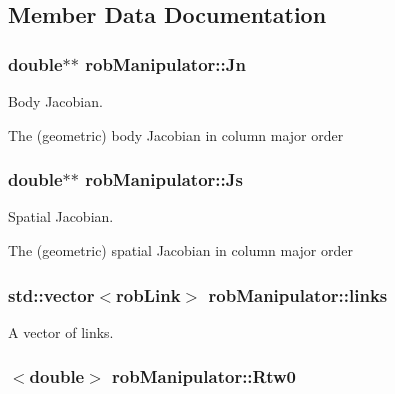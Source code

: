 \subsection{Member Data Documentation}
\hypertarget{classrob_manipulator_a997ff4a6cabe644ff4dd4877d51e2fb4}{}
\subsubsection[{Jn}]{\setlength{\rightskip}{0pt plus 5cm}double$\ast$$\ast$ rob\+Manipulator\+::\+Jn}\label{classrob_manipulator_a997ff4a6cabe644ff4dd4877d51e2fb4}


Body Jacobian. 

The (geometric) body Jacobian in column major order \hypertarget{classrob_manipulator_a5c8636fedd8f1a77ea297f87527cb85e}{}
\subsubsection[{Js}]{\setlength{\rightskip}{0pt plus 5cm}double$\ast$$\ast$ rob\+Manipulator\+::\+Js}\label{classrob_manipulator_a5c8636fedd8f1a77ea297f87527cb85e}


Spatial Jacobian. 

The (geometric) spatial Jacobian in column major order \hypertarget{classrob_manipulator_a255e6fb341202762ad75a54c1d040eda}{}
\subsubsection[{links}]{\setlength{\rightskip}{0pt plus 5cm}std\+::vector$<${\bf rob\+Link}$>$ rob\+Manipulator\+::links}\label{classrob_manipulator_a255e6fb341202762ad75a54c1d040eda}


A vector of links. 

\hypertarget{classrob_manipulator_ab48d9d9a166bf252698bc35788ca6ad6}{}
\subsubsection[{Rtw0}]{$<$double$>$ rob\+Manipulator\+::\+Rtw0}\label{classrob_manipulator_ab48d9d9a166bf252698bc35788ca6ad6}


